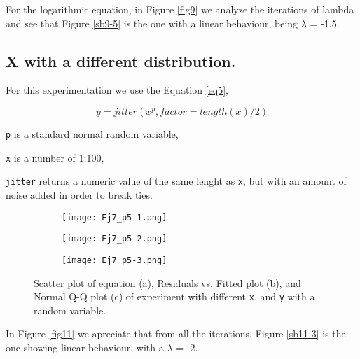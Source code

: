 \documentclass{article}
\begin{document}
For the logarithmic equation, in Figure \ref{fig9} we analyze the iterations of lambda and see that Figure \ref{sb9-5} is the one with a linear behaviour, being $\lambda$ = -1.5.\\

\clearpage

\subsection{X with a different distribution.}

For this experimentation we use the Equation \ref{eq5},

\begin{equation} \label{eq5}
y = jitter(x^p, factor = length(x)/2)
\end{equation} 
\begin{description}
\item \texttt{p} is a standard normal random variable,
\item \texttt{x} is a number of 1:100,
\item \texttt{jitter} returns a numeric value of the same lenght as \texttt{x}, but with an amount of noise added in order to break ties.
\end{description}

\begin{figure}[]
\begin{subfigure}{.3\textwidth}
  \centering
  \texttt{[image: Ej7\_p5-1.png]}  
  \caption{ }
  \label{sb10-1}
\end{subfigure}
\begin{subfigure}{.3\textwidth}
  \centering
  \texttt{[image: Ej7\_p5-2.png]}  
  \caption{ }
  \label{sb10-2}
\end{subfigure}
\begin{subfigure}{.3\textwidth}
  \centering
  \texttt{[image: Ej7\_p5-3.png]}  
  \caption{ }
  \label{sb10-3}
\end{subfigure}
\caption{Scatter plot of equation (a), Residuals vs. Fitted plot (b), and Normal Q-Q plot (c) of experiment with different \texttt{x}, and \texttt{y} with a random variable.}
\label{fig10}
\end{figure}

In Figure \ref{fig11} we apreciate that from all the iterations, Figure \ref{sb11-3} is the one showing linear behaviour, with a $\lambda$ = -2.\\
\end{document}
